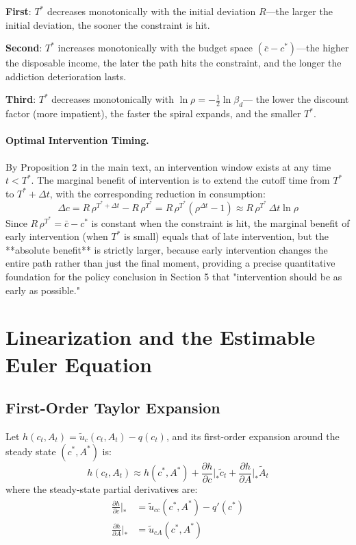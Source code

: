 \documentclass[12pt]{article}
\begin{document}
\textbf{First}: $T^*$ decreases monotonically with the initial deviation $R$---the larger the initial deviation, the sooner the constraint is hit.

\textbf{Second}: $T^*$ increases monotonically with the budget space $(\bar{c} - c^*)$---the higher the disposable income,
the later the path hits the constraint, and the longer the addiction deterioration lasts.

\textbf{Third}: $T^*$ decreases monotonically with $\ln\rho = -\frac{1}{2}\ln\beta_d$---
the lower the discount factor (more impatient), the faster the spiral expands, and the smaller $T^*$.

\paragraph{Optimal Intervention Timing.}
By Proposition 2 in the main text, an intervention window exists at any time $t < T^*$.
The marginal benefit of intervention is to extend the cutoff time from $T^*$ to $T^* + \Delta t$,
with the corresponding reduction in consumption:
\begin{equation}
\Delta c = R\,\rho^{T^*+\Delta t} - R\,\rho^{T^*}
= R\,\rho^{T^*}(\rho^{\Delta t} - 1)
\approx R\,\rho^{T^*}\,\Delta t\ln\rho
\end{equation}
Since $R\,\rho^{T^*} = \bar{c} - c^*$ is constant when the constraint is hit,
the marginal benefit of early intervention (when $T^*$ is small) equals that of late intervention, but the **absolute benefit** is strictly larger,
because early intervention changes the entire path rather than just the final moment,
providing a precise quantitative foundation for the policy conclusion in Section 5 that "intervention should be as early as possible."


\section{Linearization and the Estimable Euler Equation}

\subsection{First-Order Taylor Expansion}
 
Let $h(c_t, A_t) = \tilde{u}_c(c_t, A_t) - q(c_t)$,
and its first-order expansion around the steady state $(c^*, A^*)$ is:
\begin{equation}
    h(c_t, A_t) \approx h(c^*, A^*)
    + \frac{\partial h}{\partial c}\bigg|_{*} \tilde{c}_t
    + \frac{\partial h}{\partial A}\bigg|_{*} \tilde{A}_t
    \label{eq:taylor}
\end{equation}
where the steady-state partial derivatives are:
\begin{align}
    \frac{\partial h}{\partial c}\bigg|_{*}
    &= \tilde{u}_{cc}(c^*, A^*) - q'(c^*)
    \label{eq:hc} \\[4pt]
    \frac{\partial h}{\partial A}\bigg|_{*}
    &= \tilde{u}_{cA}(c^*, A^*)
    \label{eq:hA}
\end{align}
 
\end{document}
